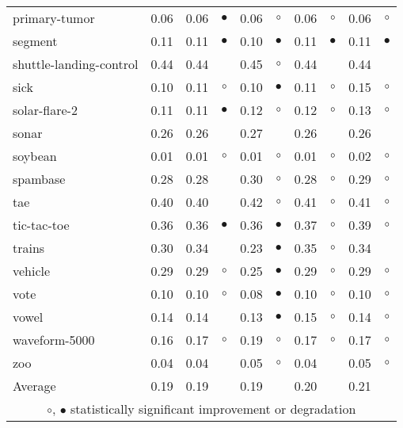 {\begin{longtable}{lrr@{\hspace{0.1cm}}cr@{\hspace{0.1cm}}cr@{\hspace{0.1cm}}cr@{\hspace{0.1cm}}c}
primary-tumor & 0.06 & 0.06 &  $\bullet$ & 0.06 &   $\circ$ & 0.06 &   $\circ$ & 0.06 &   $\circ$\\
segment & 0.11 & 0.11 &  $\bullet$ & 0.10 & $\bullet$ & 0.11 & $\bullet$ & 0.11 & $\bullet$\\
shuttle-landing-control & 0.44 & 0.44 &            & 0.45 &   $\circ$ & 0.44 &           & 0.44 &          \\
sick & 0.10 & 0.11 &    $\circ$ & 0.10 & $\bullet$ & 0.11 &   $\circ$ & 0.15 &   $\circ$\\
solar-flare-2 & 0.11 & 0.11 &  $\bullet$ & 0.12 &   $\circ$ & 0.12 &   $\circ$ & 0.13 &   $\circ$\\
sonar & 0.26 & 0.26 &            & 0.27 &           & 0.26 &           & 0.26 &          \\
soybean & 0.01 & 0.01 &    $\circ$ & 0.01 &   $\circ$ & 0.01 &   $\circ$ & 0.02 &   $\circ$\\
spambase & 0.28 & 0.28 &            & 0.30 &   $\circ$ & 0.28 &   $\circ$ & 0.29 &   $\circ$\\
tae & 0.40 & 0.40 &            & 0.42 &   $\circ$ & 0.41 &   $\circ$ & 0.41 &   $\circ$\\
tic-tac-toe & 0.36 & 0.36 &  $\bullet$ & 0.36 & $\bullet$ & 0.37 &   $\circ$ & 0.39 &   $\circ$\\
trains & 0.30 & 0.34 &            & 0.23 & $\bullet$ & 0.35 &   $\circ$ & 0.34 &          \\
vehicle & 0.29 & 0.29 &    $\circ$ & 0.25 & $\bullet$ & 0.29 &   $\circ$ & 0.29 &   $\circ$\\
vote & 0.10 & 0.10 &    $\circ$ & 0.08 & $\bullet$ & 0.10 &   $\circ$ & 0.10 &   $\circ$\\
vowel & 0.14 & 0.14 &            & 0.13 & $\bullet$ & 0.15 &   $\circ$ & 0.14 &   $\circ$\\
waveform-5000 & 0.16 & 0.17 &    $\circ$ & 0.19 &   $\circ$ & 0.17 &   $\circ$ & 0.17 &   $\circ$\\
zoo & 0.04 & 0.04 &            & 0.05 &   $\circ$ & 0.04 &           & 0.05 &   $\circ$\\
\hline
Average & 0.19 & 0.19 &            & 0.19 &           & 0.20 &           & 0.21 &          \\
\hline
\multicolumn{10}{c}{$\circ$, $\bullet$ statistically significant improvement or degradation}\\
\end{longtable} \footnotesize \par}
